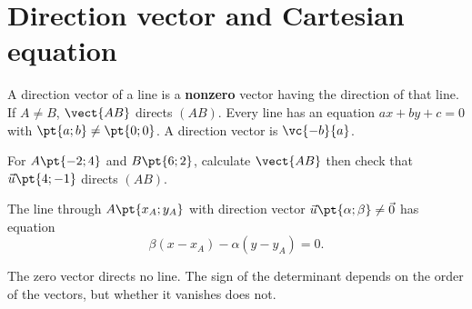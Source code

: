 \section{Direction vector and Cartesian equation}
\begin{keypoint}[Definition]
A direction vector of a line is a \textbf{nonzero} vector having the direction of that line. If $A\ne B$, $\vect{AB}$ directs $(AB)$.
Every line has an equation $ax+by+c=0$ with $\pt{a;b}\ne\pt{0;0}$. A direction vector is $\vc{-b}{a}$.
\end{keypoint}
\begin{example}For $A\pt{-2;4}$ and $B\pt{6;2}$, calculate $\vect{AB}$ then check that $\vec u\pt{4;-1}$ directs $(AB)$.\end{example}
\begin{keypoint}
The line through $A\pt{x_A;y_A}$ with direction vector $\vec u\pt{\alpha;\beta}\ne\vec0$ has equation
\[\beta(x-x_A)-\alpha(y-y_A)=0.\]
\end{keypoint}
\begin{pitfall}The zero vector directs no line. The sign of the determinant depends on the order of the vectors, but whether it vanishes does not.\end{pitfall}


